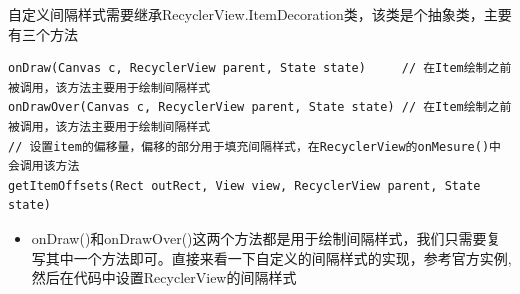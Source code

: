 \documentclass[9pt, b5paper]{article}
\begin{document}
自定义间隔样式需要继承RecyclerView.ItemDecoration类，该类是个抽象类，主要有三个方法
\begin{verbatim}
onDraw(Canvas c, RecyclerView parent, State state)     // 在Item绘制之前被调用，该方法主要用于绘制间隔样式
onDrawOver(Canvas c, RecyclerView parent, State state) // 在Item绘制之前被调用，该方法主要用于绘制间隔样式
// 设置item的偏移量，偏移的部分用于填充间隔样式，在RecyclerView的onMesure()中会调用该方法
getItemOffsets(Rect outRect, View view, RecyclerView parent, State state)
\end{verbatim}
\begin{itemize}
\item onDraw()和onDrawOver()这两个方法都是用于绘制间隔样式，我们只需要复写其中一个方法即可。直接来看一下自定义的间隔样式的实现，参考官方实例, 然后在代码中设置RecyclerView的间隔样式
\end{itemize}
\end{document}
